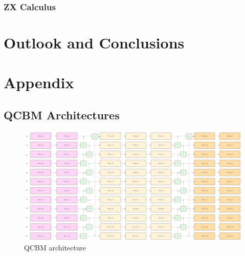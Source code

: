 \documentclass[12pt]{article}
\numberwithin{equation}{section}
\begin{document}
\subsubsection{ZX Calculus}

\clearpage 

\section{Outlook and Conclusions}


\clearpage
\section{Appendix}
\subsection{QCBM Architectures}

\begin{figure}[h]
    \centering
    \includegraphics[scale=0.3, angle=270, width=\textwidth-209]{qcbm1.png}
    \caption{QCBM architecture}
\end{figure}
\clearpage


\printbibliography
\end{document}
